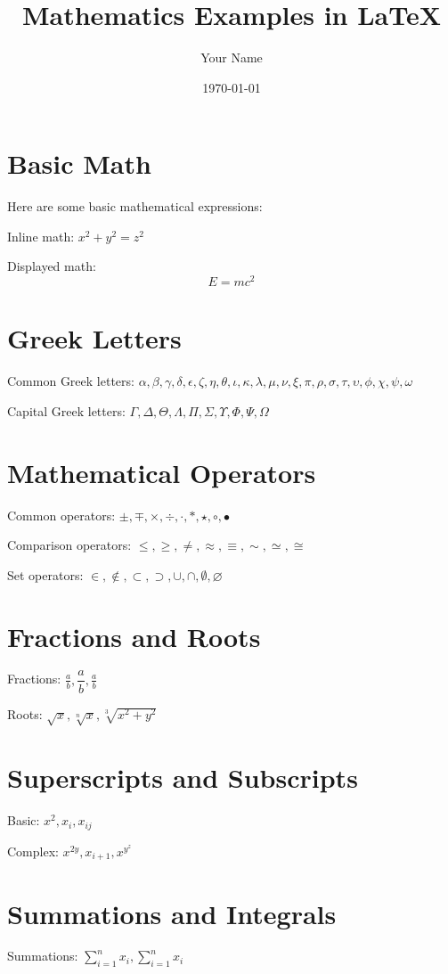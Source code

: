 \documentclass{article}
\title{Mathematics Examples in LaTeX}
\author{Your Name}
\date{\today}
\begin{document}
\maketitle

\section{Basic Math}
Here are some basic mathematical expressions:

Inline math: $x^2 + y^2 = z^2$

Displayed math:
\[
E = mc^2
\]

\section{Greek Letters}
Common Greek letters:
$\alpha, \beta, \gamma, \delta, \epsilon, \zeta, \eta, \theta, \iota, \kappa, \lambda, \mu, \nu, \xi, \pi, \rho, \sigma, \tau, \upsilon, \phi, \chi, \psi, \omega$

Capital Greek letters:
$\Gamma, \Delta, \Theta, \Lambda, \Pi, \Sigma, \Upsilon, \Phi, \Psi, \Omega$

\section{Mathematical Operators}
Common operators:
$\pm, \mp, \times, \div, \cdot, \ast, \star, \circ, \bullet$

Comparison operators:
$\leq, \geq, \neq, \approx, \equiv, \sim, \simeq, \cong$

Set operators:
$\in, \notin, \subset, \supset, \cup, \cap, \emptyset, \varnothing$

\section{Fractions and Roots}
Fractions:
$\frac{a}{b}, \dfrac{a}{b}, \tfrac{a}{b}$

Roots:
$\sqrt{x}, \sqrt[n]{x}, \sqrt[3]{x^2 + y^2}$

\section{Superscripts and Subscripts}
Basic: $x^2, x_i, x_{ij}$

Complex: $x^{2y}, x_{i+1}, x^{y^z}$

\section{Summations and Integrals}
Summations:
$\sum_{i=1}^{n} x_i, \sum\limits_{i=1}^{n} x_i$
\end{document}
